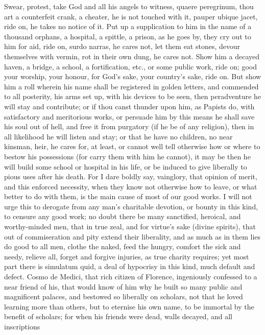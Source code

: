 {Swear, protest, take God and all his angels to witness, quaere
peregrinum, thou art a counterfeit crank, a cheater, he is not touched
with it, pauper ubique jacet, ride on, he takes no notice of it. Put up
a supplication to him in the name of a thousand orphans, a hospital, a
spittle, a prison, as he goes by, they cry out to him for aid, ride on,
surdo narras, he cares not, let them eat stones, devour themselves with
vermin, rot in their own dung, he cares not. Show him a decayed haven,
a bridge, a school, a fortification, etc., or some public work, ride
on; good your worship, your honour, for God's sake, your country's
sake, ride on. But show him a roll wherein his name shall be registered
in golden letters, and commended to all posterity, his arms set up,
with his devices to be seen, then peradventure he will stay and
contribute; or if thou canst thunder upon him, as Papists do, with
satisfactory and meritorious works, or persuade him by this means he
shall save his soul out of hell, and free it from purgatory (if he be
of any religion), then in all likelihood he will listen and stay; or
that he have no children, no near kinsman, heir, he cares for, at
least, or cannot well tell otherwise how or where to bestow his
possessions (for carry them with him he cannot), it may be then he will
build some school or hospital in his life, or be induced to give
liberally to pious uses after his death. For I dare boldly say,
vainglory, that opinion of merit, and this enforced necessity, when
they know not otherwise how to leave, or what better to do with them,
is the main cause of most of our good works. I will not urge this to
derogate from any man's charitable devotion, or bounty in this kind, to
censure any good work; no doubt there be many sanctified, heroical, and
worthy-minded men, that in true zeal, and for virtue's sake (divine
spirits), that out of commiseration and pity extend their liberality,
and as much as in them lies do good to all men, clothe the naked, feed
the hungry, comfort the sick and needy, relieve all, forget and forgive
injuries, as true charity requires; yet most part there is simulatum
quid, a deal of hypocrisy in this kind, much default and defect.
Cosmo de Medici, that rich citizen of Florence, ingeniously
confessed to a near friend of his, that would know of him why he built
so many public and magnificent palaces, and bestowed so liberally on
scholars, not that he loved learning more than others, but to
eternise his own name, to be immortal by the benefit of scholars;
for when his friends were dead, walls decayed, and all inscriptions
}
